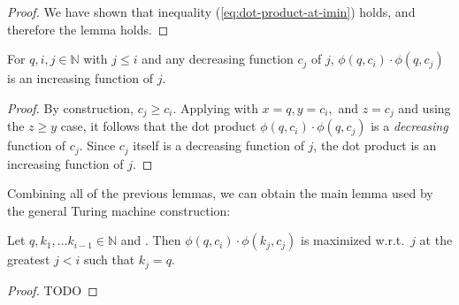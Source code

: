 \begin{proof}
    We have shown that inequality (\ref{eq:dot-product-at-imin}) holds, and therefore the lemma holds.
\end{proof}

\begin{lemma}
    \label{lem:q-most-recent}
    For $q, i, j \in \mathbb{N}$ with $j \leq i$ and any decreasing function $c_j$ of $j$, $\phi(q, c_i) \cdot \phi(q, c_j)$ is an increasing function of $j$.
\end{lemma}

\begin{proof}
    By construction, $c_j \geq c_i$. Applying  with $x = q, y = c_i,$ and $z = c_j$ and using the $z \geq y$ case, it follows that the dot product $\phi(q, c_i) \cdot \phi(q, c_j)$ is a \emph{decreasing} function of $c_j$. Since $c_j$ itself is a decreasing function of $j$, the dot product is an increasing function of $j$.
\end{proof}

Combining all of the previous lemmas, we can obtain the main lemma used by the general Turing machine construction:

\begin{lemma} \label{lem:rightmost-lnorm}
    Let $q, k_1, \ldots k_{i-1} \in \mathbb{N}$
    and . Then $\phi(q, c_i) \cdot \phi(k_j, c_j)$ is maximized w.r.t.~$j$
    at the greatest $j < i$ such that $k_j = q$.
\end{lemma}

\begin{proof}
    TODO
\end{proof}


